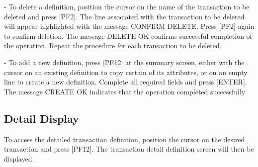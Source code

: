 \documentclass[letterpaper,10pt,english]{sphinxmanual}
\begin{document}
 - To delete a definition, position the cursor on the name of the transaction to be deleted and press {[}PF2{]}. The line associated with the transaction to be deleted will appear highlighted with the message CONFIRM DELETE. Press {[}PF2{]} again to confirm deletion. The message DELETE OK confirms successful completion of the operation. Repeat the procedure for each transaction to be deleted.

 - To add a new definition, press {[}PF12{]} at the summary screen, either with the cursor on an existing definition to copy certain of its attributes, or on an empty line to create a new definition. Complete all required fields and press {[}ENTER{]}. The message CREATE OK indicates that the operation completed successfully


\subsection{Detail Display}
\label{\detokenize{connectivity_guide:index-114}}\label{\detokenize{connectivity_guide:id64}}
To access the detailed transaction definition, position the cursor on the desired transaction and press {[}PF12{]}. The transaction detail definition screen will then be displayed.



\end{document}
